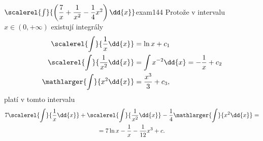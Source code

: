 \begin{mathexam}{\(\scalerel{\int}{\left(\dfrac{7}{x}+ \dfrac{1}{x^2} -
    \dfrac{1}{4}x^2\right)\dd{x}}\)}{exam144} 
    Protože v intervalu \(x\in(0, +\infty)\) existují integrály
    \begin{align*}
      \scalerel{\int}{\dfrac{1}{x}\dd{x}}   &= \ln x + c_1  \\
      \scalerel{\int}{\dfrac{1}{x^2}\dd{x}} &= \int x^{-2}\dd{x} = -\dfrac{1}{x} + c_2  \\
      \mathlarger{\int}{x^2\dd{x}}            &= \dfrac{x^3}{3} + c_3 ,
    \end{align*}  
    platí v tomto intervalu
    \begin{multline*}
                  7\scalerel{\int}{\dfrac{1}{x}\dd{x}}   + 
                   \scalerel{\int}{\dfrac{1}{x^2}\dd{x}} - 
       \dfrac{1}{4}\mathlarger{\int}{x^2\dd{x}} =                   \\
      =7\ln x - \dfrac{1}{x} - \dfrac{1}{12}x^3 + c.
    \end{multline*}
\end{mathexam}